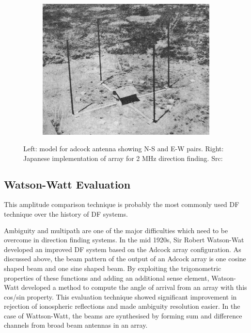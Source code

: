 \begin{figure}
\begin{subfigure}[b]{0.6\textwidth}
    \includegraphics[width=\textwidth]{./img/lit_review/adcock_implementation}
  \end{subfigure}
  \caption{Left: model for adcock antenna showing N-S and E-W pairs. Right: Japanese implementation of array for 2 MHz direction finding. Src: \cite{japanesecommunications}}
  \label{fig:lit_adcock_array}
\end{figure}


\subsection{Watson-Watt Evaluation}
This amplitude comparison technique is probably the most commonly used DF technique over the history of DF systems\cite{poisel2012electronic}.

Ambiguity and multipath are one of the major difficulties which need to be overcome in direction finding systems. 
In the mid 1920s, Sir Robert Watson-Wat developed an improved DF system based on the Adcock array configuration. 
As discussed above, the beam pattern of the output of an Adcock array is one cosine shaped beam and one sine shaped beam. By exploiting the trigonometric properties of these functions and adding an additional sense element, Watson-Watt developed a method to compute the angle of arrival from an array with this cos/sin property. 
This evaluation technique showed significant improvement in rejection of ionospheric reflections and made ambiguity resolution easier.
In the case of Wattson-Watt, the beams are synthesised by forming sum and difference channels from broad beam antennas in an array.

